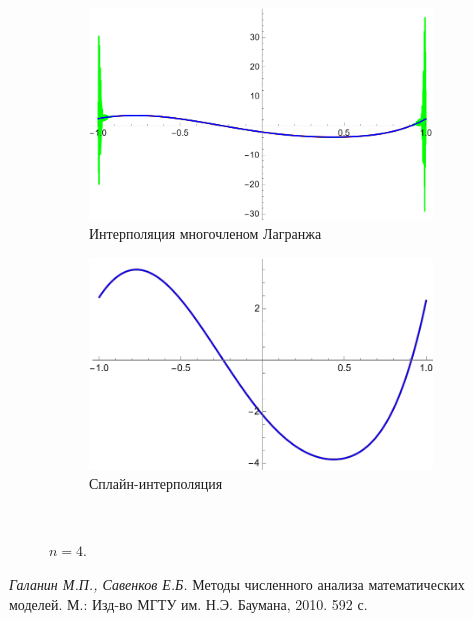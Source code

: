 \documentclass[12pt, a4paper]{article}
\begin{document}
	\begin{figure}[H]
		\centering
		\begin{subfigure}{0.4\textwidth}
			\includegraphics[width=\textwidth]{4_l64}
			\caption{Интерполяция многочленом Лагранжа}
		\end{subfigure}
		\hfill
		\begin{subfigure}{0.4\textwidth}
			\includegraphics[width=\textwidth]{4_s64}
			\caption{Сплайн-интерполяция}
		\end{subfigure}
		\hfill
		\\[0.5cm]
		\caption{$n = 4$.}
	\end{figure}
	
	
	\newpage
	\begin{thebibliography}{1}
		 \textit{Галанин М.П., Савенков Е.Б.} Методы численного анализа математических\\ моделей. М.: Изд-во МГТУ им. Н.Э. Баумана,	2010. 592 с.
		
		
	\end{thebibliography}
	
	
\end{document}
